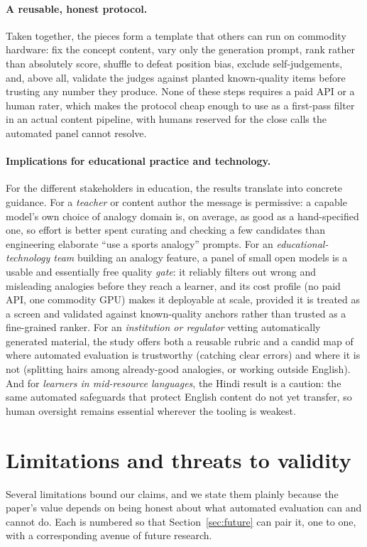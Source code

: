 \documentclass[11pt]{article}
\begin{document}
\paragraph{A reusable, honest protocol.}
Taken together, the pieces form a template that others can run on commodity hardware: fix
the concept content, vary only the generation prompt, rank rather than absolutely score,
shuffle to defeat position bias, exclude self-judgements, and, above all, validate the
judges against planted known-quality items before trusting any number they produce. None of
these steps requires a paid API or a human rater, which makes the protocol cheap enough to
use as a first-pass filter in an actual content pipeline, with humans reserved for the
close calls the automated panel cannot resolve.

\paragraph{Implications for educational practice and technology.} For the different stakeholders in
education, the results translate into concrete guidance. For a \emph{teacher} or content author the
message is permissive: a capable model's own choice of analogy domain is, on average, as good as a
hand-specified one, so effort is better spent curating and checking a few candidates than engineering
elaborate ``use a sports analogy'' prompts. For an \emph{educational-technology team} building an
analogy feature, a panel of small open models is a usable and essentially free quality \emph{gate}: it
reliably filters out wrong and misleading analogies before they reach a learner, and its cost profile
(no paid API, one commodity GPU) makes it deployable at scale, provided it is treated as a screen and
validated against known-quality anchors rather than trusted as a fine-grained ranker. For an
\emph{institution or regulator} vetting automatically generated material, the study offers both a
reusable rubric and a candid map of where automated evaluation is trustworthy (catching clear errors)
and where it is not (splitting hairs among already-good analogies, or working outside English). And
for \emph{learners in mid-resource languages}, the Hindi result is a caution: the same automated
safeguards that protect English content do not yet transfer, so human oversight remains essential
wherever the tooling is weakest.

\section{Limitations and threats to validity}
\label{sec:limitations}
Several limitations bound our claims, and we state them plainly because the paper's value depends on
being honest about what automated evaluation can and cannot do. Each is numbered so that
Section~\ref{sec:future} can pair it, one to one, with a corresponding avenue of future research.
\end{document}
